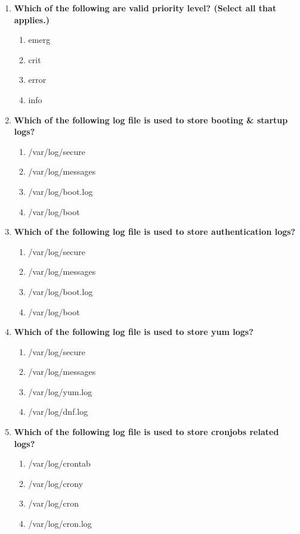\begin{flushleft}
\begin{enumerate}
		\item \textbf{Which of the following are valid priority level? (Select all that applies.)}
		\begin{enumerate}[label=(\alph*)]
			\item emerg   %
			\item crit  %
			\item error  %
			\item info   %
		\end{enumerate}
		\bigskip
		\bigskip	

		\item \textbf{Which of the following log file is used to store booting \& startup logs?}
		\begin{enumerate}[label=(\alph*)]
			\item /var/log/secure
			\item /var/log/messages
			\item /var/log/boot.log  %
			\item /var/log/boot   
		\end{enumerate}
		\bigskip
		\bigskip	

		\item \textbf{Which of the following log file is used to store authentication logs?}
		\begin{enumerate}[label=(\alph*)]
			\item /var/log/secure     %
			\item /var/log/messages
			\item /var/log/boot.log  
			\item /var/log/boot   
		\end{enumerate}
		\bigskip
		\bigskip	

		\item \textbf{Which of the following log file is used to store yum logs?}
		\begin{enumerate}[label=(\alph*)]
			\item /var/log/secure    
			\item /var/log/messages
			\item /var/log/yum.log 
			\item /var/log/dnf.log     %
		\end{enumerate}
		\bigskip
		\bigskip	

		\item \textbf{Which of the following log file is used to store cronjobs related logs?}
		\begin{enumerate}[label=(\alph*)]
			\item /var/log/crontab
			\item /var/log/crony
			\item /var/log/cron   %
			\item /var/log/cron.log
		\end{enumerate}
		\bigskip
		\bigskip	


\end{enumerate}
\end{flushleft}
